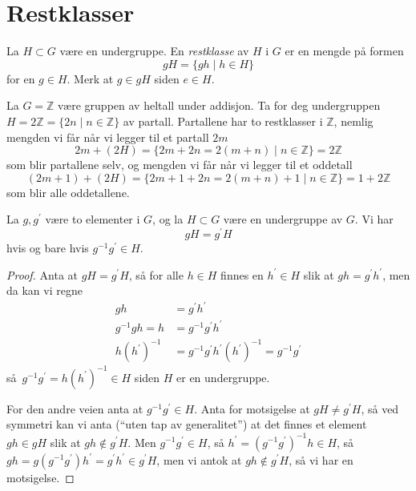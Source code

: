 
\section{Restklasser}

\begin{definition}
    La $H\subset G$ være en undergruppe.
    En \textit{restklasse} av $H$ i $G$ er en mengde på formen
    \[
        gH = \{gh\mid h\in H\}
    \]
    for en $g\in H$.
    Merk at $g\in gH$ siden $e\in H$.
\end{definition}

\begin{example}
    La $G = \mathbb Z$ være gruppen av heltall under addisjon.
    Ta for deg undergruppen $H = 2\mathbb Z = \{ 2n\mid n\in \mathbb Z\}$
    av partall.
    Partallene har to restklasser i $\mathbb Z$,
    nemlig mengden vi får når vi legger til et partall $2m$
    \[
        2m + (2H) = \{2m + 2n = 2(m + n)\mid n\in \mathbb Z\} = 2\mathbb Z
    \]
    som blir partallene selv,
    og mengden vi får når vi legger til et oddetall
    \[
        (2m + 1) + (2H) = \{2m + 1 + 2n
        = 2(m + n) + 1\mid n\in \mathbb Z\} = 1 + 2\mathbb Z
    \]
    som blir alle oddetallene.
\end{example}

\begin{lemma}
    La $g, g^\prime$ være to elementer i $G$,
    og la $H\subset G$ være en undergruppe av $G$.
    Vi har
    \[
        gH = g^\prime H
    \]
    hvis og bare hvis $g^{-1} g^\prime\in H$.
\end{lemma}
\begin{proof}
    Anta at $g H = g^\prime H$,
    så for alle $h\in H$ finnes en $h^\prime\in H$
    slik at $gh = g^\prime h^\prime$,
    men da kan vi regne
    \[\begin{aligned}
        gh &= g^\prime h^\prime \\
        g^{-1} gh = h
           &= g^{-1} g^\prime h^\prime \\
        h {(h^\prime)}^{-1}
           &= g^{-1} g^\prime h^\prime {(h^\prime)}^{-1}
            = g^{-1} g^\prime
    \end{aligned}\]
    så $g^{-1}g^\prime = h {(h^\prime)}^{-1}\in H$ siden $H$ er en undergruppe.

    For den andre veien anta at $g^{-1} g^\prime \in H$.
    Anta for motsigelse at $gH\neq g^\prime H$,
    så ved symmetri kan vi anta (``uten tap av generalitet'')
    at det finnes et element $gh\in gH$
    slik at $gh\notin g^\prime H$.
    Men $g^{-1} g^\prime \in H$,
    så $h^\prime = {(g^{-1} g^\prime)}^{-1} h\in H$,
    så $gh = g (g^{-1}g^\prime) h^\prime = g^\prime h^\prime \in g^\prime H$,
    men vi antok at $gh\notin g^\prime H$, så vi har en motsigelse.
\end{proof}


